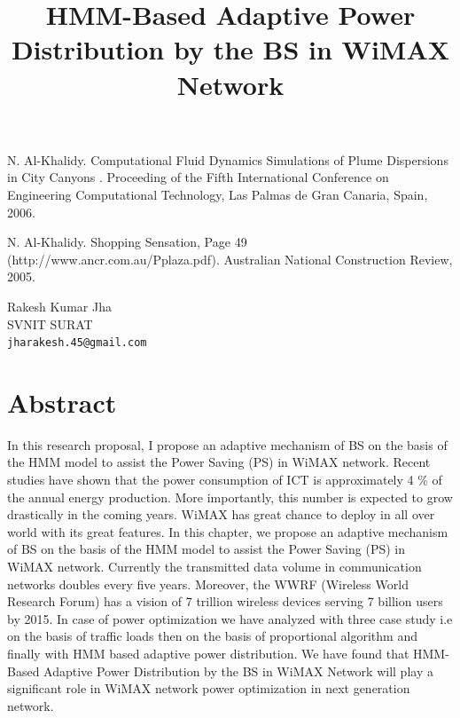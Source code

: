 \documentclass[article, A4, 11pt]{llncs}%
\begin{document}

\begin{thebibliography}{10}
{\sc N. Al-Khalidy}. {Computational Fluid Dynamics Simulations of Plume Dispersions in City Canyons }. Proceeding of the Fifth International Conference on Engineering Computational Technology, Las Palmas de Gran Canaria, Spain, 2006.

{\sc N. Al-Khalidy}. {Shopping Sensation, Page 49 (http://www.ancr.com.au/Pplaza.pdf)}. Australian National Construction Review, 2005.
\end{thebibliography} %

\title{HMM-Based Adaptive Power Distribution by the BS in WiMAX Network}
 \author{} \institute{}
\maketitle
\begin{center}
{\large Rakesh Kumar Jha}\\
SVNIT SURAT\\
{\tt jharakesh.45@gmail.com}
\end{center}

\section*{Abstract}
In this research proposal, I propose an adaptive mechanism of BS on the basis of the HMM model to assist the Power Saving (PS) in WiMAX network. Recent studies have shown that the power consumption of ICT is approximately 4 \% of the annual energy production. More importantly, this number is expected to grow drastically in the coming years. WiMAX has great chance to deploy in all over world with its great features. In this chapter, we propose an adaptive mechanism of BS on the basis of the HMM model to assist the Power Saving (PS) in WiMAX network. Currently the transmitted data volume in communication networks doubles every five years. Moreover, the WWRF (Wireless World Research Forum) has a vision of 7 trillion wireless devices serving 7 billion users by 2015. In case of power optimization we have analyzed with three case study i.e on the basis of traffic loads then on the basis of proportional algorithm and finally with HMM based adaptive power distribution. We have found that HMM-Based Adaptive Power Distribution by the BS in WiMAX Network will play a significant role in WiMAX network power optimization in next generation network.
\end{document}
